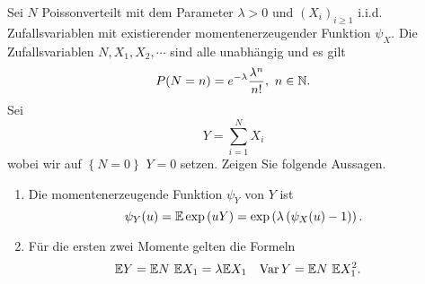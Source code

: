 Sei $N$ Poissonverteilt mit dem Parameter $\lambda>0$ und $\left( X_i
\right)_{i\geq 1}$ i.i.d.  Zufallsvariablen mit existierender
momentenerzeugender Funktion $\psi_X$. Die Zufallsvariablen $N, X_1, X_2,
\cdots$ sind alle unabhängig und es gilt 
\begin{equation*}
    P(N=n) = e^{-\lambda} \frac{\lambda^n}{ n!}, \ n\in\mathbb N. 
\end{equation*}
Sei
\begin{equation*}
    Y = \sum_{i=1}^{N} X_i
\end{equation*}
wobei wir auf $\left\{ N=0 \right\}$ $Y=0$ setzen. Zeigen Sie folgende Aussagen.
\begin{enumerate}
    \item Die momentenerzeugende Funktion $\psi_Y$ von $Y$ ist
        \begin{equation*}
            \psi_Y(u) = \mathbb{E} \exp \left( u Y \right) = 
            \exp \left( \lambda \left( \psi_X(u)-1 \right)  \right).
        \end{equation*}
    \item Für die ersten zwei Momente gelten die Formeln
        \begin{align*}
            \mathbb{E} Y &= \mathbb{E} N \ \mathbb{E} X_1 = \lambda \mathbb{E} X_1 & 
            \operatorname{Var} Y &= \mathbb{E} N \ \mathbb{E} X_1^2. 
        \end{align*}
\end{enumerate}

